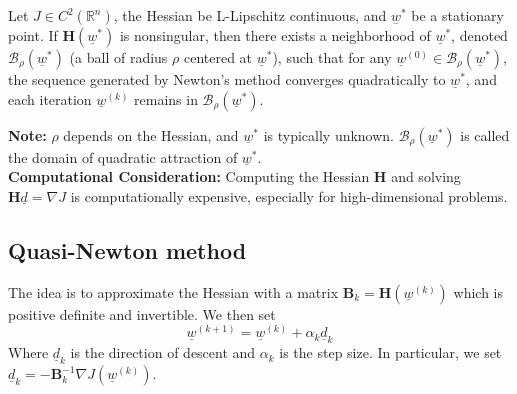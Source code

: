 \begin{theorem}
Let $J \in C^2(\mathbb{R}^n)$, the Hessian be L-Lipschitz continuous, and $\underline{w}^*$ be a stationary point. If $\mathbf{H} (\underline{w}^*)$ is nonsingular, then there exists a neighborhood of $\underline{w}^*$, denoted $\mathcal{B}_{\rho}(\underline{w}^*)$ (a ball of radius $\rho$ centered at $\underline{w}^*$), such that for any $\underline{w}^{(0)} \in \mathcal{B}_{\rho}(\underline{w}^*)$, the sequence generated by Newton's method converges quadratically to $\underline{w}^*$, and each iteration $\underline{w}^{(k)}$ remains in $\mathcal{B}_{\rho}(\underline{w}^*)$.
\end{theorem}

\textbf{Note:} $\rho$ depends on the Hessian, and $\underline{w}^*$ is typically unknown. $\mathcal{B}_{\rho}(\underline{w}^*)$ is called the domain of quadratic attraction of $\underline{w}^*$.\\

\textbf{Computational Consideration:} Computing the Hessian $\mathbf{H}$ and solving $\mathbf{H}\underline{d} = \nabla J$ is computationally expensive, especially for high-dimensional problems.\\

\subsection{Quasi-Newton method}
The idea is to approximate the Hessian with a matrix $\mathbf{B}_k = \mathbf{H}(\underline{w}^{(k)})$ which is positive definite and invertible. We then set 
\[
    \underline{w}^{(k+1)} = \underline{w}^{(k)} + \alpha_k \underline{d}_k 
\]
Where $\underline{d}_k$ is the direction of descent and $\alpha_k$ is the step size. In particular, we set $\underline{d}_k = - \mathbf{B}_k^{-1}\nabla J(\underline{w}^{(k)})$.\\

